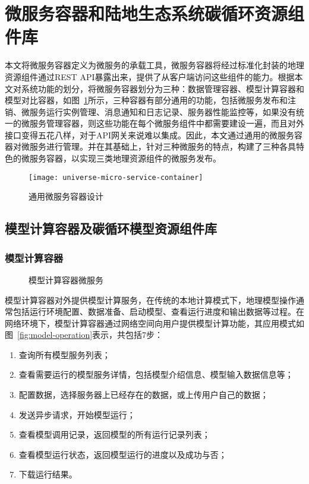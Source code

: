 \section{微服务容器和陆地生态系统碳循环资源组件库}
本文将微服务容器定义为微服务的承载工具，微服务容器将经过标准化封装的地理资源组件通过REST API暴露出来，提供了从客户端访问这些组件的能力。根据本文对系统功能的划分，将微服务容器划分为三种：数据管理容器、模型计算容器和模型对比容器，如图~\ref{fig:universe-micro-service-container}所示，三种容器有部分通用的功能，包括微服务发布和注销、微服务运行实例管理、消息通知和日志记录、服务器性能监控等，如果没有统一的微服务管理容器，则这些功能在每个微服务组件中都需要建设一遍，而且对外接口变得五花八样，对于API网关来说难以集成。因此，本文通过通用的微服务容器对微服务进行管理。并在其基础上，针对三种微服务的特点，构建了三种各具特色的微服务容器，以实现三类地理资源组件的微服务发布。

\begin{figure}[!htbp]
    \centering
    \texttt{[image: universe-micro-service-container]}
    \caption{通用微服务容器设计}
    \label{fig:universe-micro-service-container}
\end{figure}

\subsection{模型计算容器及碳循环模型资源组件库}
\subsubsection{模型计算容器}
\begin{figure}[!htbp]
    \centering
    \hfill
    \caption{模型计算容器微服务}
    \label{fig:ms-server-microservice}
\end{figure}

模型计算容器对外提供模型计算服务，在传统的本地计算模式下，地理模型操作通常包括运行环境配置、数据准备、启动模型、查看运行进度和输出数据等过程。在网络环境下，模型计算容器通过网络空间向用户提供模型计算功能，其应用模式如图~\ref{fig:model-operation}表示，共包括7步：
\begin{enumerate}[(1)]
    \item 查询所有模型服务列表；
    \item 查看需要运行的模型服务详情，包括模型介绍信息、模型输入数据信息等；
    \item 配置数据，选择服务器上已经存在的数据，或上传用户自己的数据；
    \item 发送异步请求，开始模型运行；
    \item 查看模型调用记录，返回模型的所有运行记录列表；
    \item 查看模型运行状态，返回模型运行的进度以及成功与否；
    \item 下载运行结果。
\end{enumerate}


